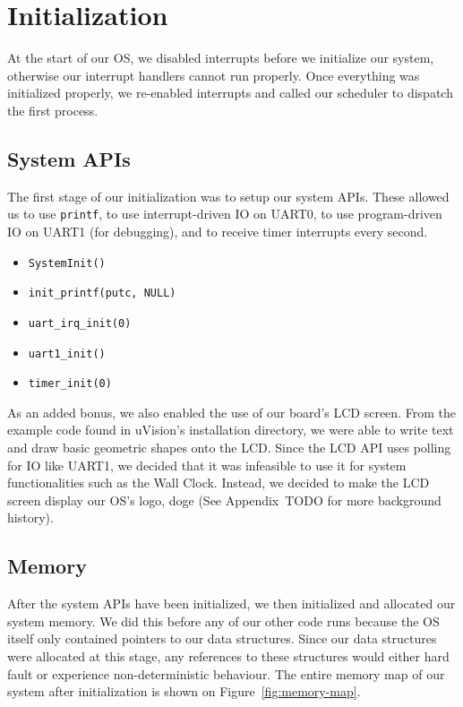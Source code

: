 \documentclass[se]{uw-wkrpt}
\begin{document}
\section{Initialization}\label{sec:init}

At the start of our OS, we disabled interrupts before we initialize our system, otherwise our interrupt handlers cannot run properly. Once everything was initialized properly, we re-enabled interrupts and called our scheduler to dispatch the first process.

\subsection{System APIs}
The first stage of our initialization was to setup our system APIs. These allowed us to use \texttt{printf}, to use interrupt-driven IO on UART0, to use program-driven IO on UART1 (for debugging), and to receive timer interrupts every second.

\begin{itemize}
	\item \texttt{SystemInit()}
	\item \texttt{init\_printf(putc, NULL)}	
	\item \texttt{uart\_irq\_init(0)}
	\item \texttt{uart1\_init()}
	\item \texttt{timer\_init(0)}
\end{itemize}

As an added bonus, we also enabled the use of our board's LCD screen. From the example code found in uVision's installation directory, we were able to write text and draw basic geometric shapes onto the LCD. Since the LCD API uses polling for IO like UART1, we decided that it was infeasible to use it for system functionalities such as the Wall Clock. Instead, we decided to make the LCD screen display our OS's logo, doge (See Appendix~TODO for more background history).


\subsection{Memory}
After the system APIs have been initialized, we then initialized and allocated our system memory. We did this before any of our other code runs because the OS itself only contained pointers to our data structures. Since our data structures were allocated at this stage, any references to these structures would either hard fault or experience non-deterministic behaviour. The entire memory map of our system after initialization is shown on Figure~\ref{fig:memory-map}. 
\end{document}
